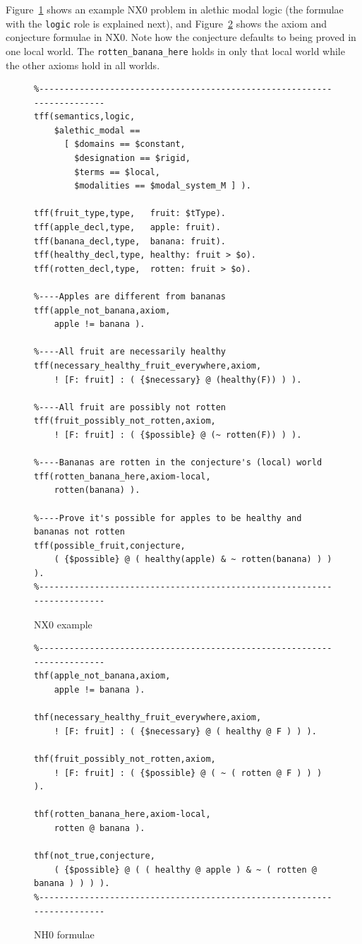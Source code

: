 \documentclass{ceurart}
\begin{document}
Figure~\ref{NX0Example} shows an example NX0 problem in alethic modal logic (the formulae
with the {\tt logic} role is explained next), and Figure~\ref{NH0Example} shows the axiom and 
conjecture formulae in NX0.
Note how the conjecture defaults to being proved in one local world. 
The {\tt rotten\_banana\_here} holds in only that local world while the other axioms hold in
all worlds.

\begin{figure}[h!]
\small
{}
\begin{verbatim}
%------------------------------------------------------------------------
tff(semantics,logic,
    $alethic_modal == 
      [ $domains == $constant,
        $designation == $rigid,
        $terms == $local,
        $modalities == $modal_system_M ] ).

tff(fruit_type,type,   fruit: $tType).
tff(apple_decl,type,   apple: fruit).
tff(banana_decl,type,  banana: fruit).
tff(healthy_decl,type, healthy: fruit > $o).
tff(rotten_decl,type,  rotten: fruit > $o).

%----Apples are different from bananas
tff(apple_not_banana,axiom,
    apple != banana ).

%----All fruit are necessarily healthy
tff(necessary_healthy_fruit_everywhere,axiom,
    ! [F: fruit] : ( {$necessary} @ (healthy(F)) ) ).

%----All fruit are possibly not rotten
tff(fruit_possibly_not_rotten,axiom,
    ! [F: fruit] : ( {$possible} @ (~ rotten(F)) ) ).

%----Bananas are rotten in the conjecture's (local) world
tff(rotten_banana_here,axiom-local,
    rotten(banana) ).

%----Prove it's possible for apples to be healthy and bananas not rotten
tff(possible_fruit,conjecture,
    ( {$possible} @ ( healthy(apple) & ~ rotten(banana) ) ) ).
%------------------------------------------------------------------------
\end{verbatim}
\caption{NX0 example}
\label{NX0Example}
\end{figure}

\begin{figure}[h!]
\small
{}
\begin{verbatim}
%------------------------------------------------------------------------
thf(apple_not_banana,axiom,
    apple != banana ).

thf(necessary_healthy_fruit_everywhere,axiom,
    ! [F: fruit] : ( {$necessary} @ ( healthy @ F ) ) ).

thf(fruit_possibly_not_rotten,axiom,
    ! [F: fruit] : ( {$possible} @ ( ~ ( rotten @ F ) ) ) ).

thf(rotten_banana_here,axiom-local,
    rotten @ banana ).

thf(not_true,conjecture,
    ( {$possible} @ ( ( healthy @ apple ) & ~ ( rotten @ banana ) ) ) ).
%------------------------------------------------------------------------
\end{verbatim}
\caption{NH0 formulae}
\label{NH0Example}
\end{figure}
\end{document}
